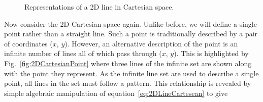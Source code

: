 \begin{figure}%
  \centering
  \caption{Representations of a 2D line in Cartesian space.}
  \label{fig:2DCartesianLineAndParameterPoint}
\end{figure}
\newline
\newline
Now consider the 2D Cartesian space again.  Unlike before, we will define a single point rather than a straight line. Such a point is traditionally described by a pair of coordinates ($x$, $y$).  However, an alternative description of the point is an infinite number of lines all of which pass through ($x$, $y$).  This is highlighted by Fig.~\ref{fig:2DCartesianPoint} where three lines of the infinite set are shown along with the point they represent.  As the infinite line set are used to describe a single point, all lines in the set must follow a pattern.  This relationship is revealed by simple algebraic manipulation of equation~\ref{eq:2DLineCartesean} to give
